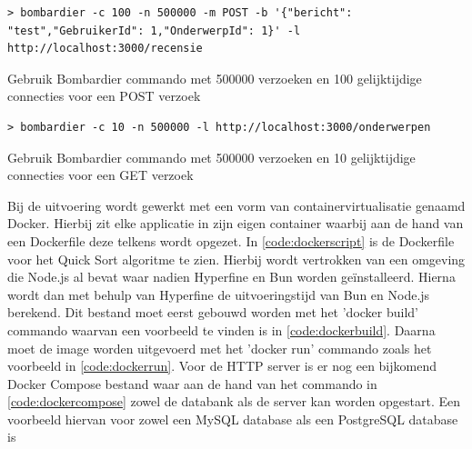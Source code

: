 \begin{listing}[H]
  \centering
  \begin{verbatim}
> bombardier -c 100 -n 500000 -m POST -b '{"bericht": "test","GebruikerId": 1,"OnderwerpId": 1}' -l http://localhost:3000/recensie
      \end{verbatim}
      \caption{\label{code:Bombardier1000}Gebruik Bombardier commando met 500000 verzoeken en 100 gelijktijdige connecties voor een POST verzoek}
\end{listing}
\begin{listing}[H]
  \centering
  \begin{verbatim}
> bombardier -c 10 -n 500000 -l http://localhost:3000/onderwerpen
      \end{verbatim}
      \caption{\label{code:Bombardier10GET}Gebruik Bombardier commando met 500000 verzoeken en 10 gelijktijdige connecties voor een GET verzoek}
\end{listing}
Bij de uitvoering wordt gewerkt met een vorm van containervirtualisatie genaamd Docker.
Hierbij zit elke applicatie in zijn eigen container waarbij aan de hand van een Dockerfile deze telkens wordt opgezet.
In \ref{code:dockerscript} is de Dockerfile voor het Quick Sort algoritme te zien. 
Hierbij wordt vertrokken van een omgeving die Node.js al bevat waar nadien Hyperfine en Bun worden geïnstalleerd.
Hierna wordt dan met behulp van Hyperfine de uitvoeringstijd van Bun en Node.js berekend.
Dit bestand moet eerst gebouwd worden met het 'docker build' commando waarvan een voorbeeld te vinden is in \ref{code:dockerbuild}.
Daarna moet de image worden uitgevoerd met het 'docker run' commando zoals het voorbeeld in \ref{code:dockerrun}.
Voor de HTTP server is er nog een bijkomend
Docker Compose bestand waar aan de hand van het commando in \ref{code:dockercompose}
zowel de databank als de server kan worden opgestart. Een voorbeeld hiervan voor zowel een MySQL database als een PostgreSQL database is 
